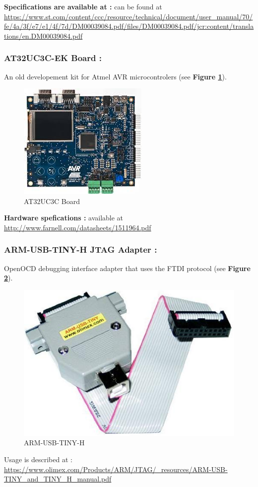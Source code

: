 \textbf{\color{red}Specifications are available at :} can be found at {\color{blue}\url{https://www.st.com/content/ccc/resource/technical/document/user_manual/70/fe/4a/3f/e7/e1/4f/7d/DM00039084.pdf/files/DM00039084.pdf/jcr:content/translations/en.DM00039084.pdf}}    	


\subsubsection{AT32UC3C-EK Board : }
An old developement kit for Atmel AVR microcontrolers (see \textbf{Figure \ref{AT32UC3C Board}}).  
		\begin{figure}[H]
			\centering
        	\includegraphics[scale=0.40]{img/mean/avr32.jpeg}
        	\caption{AT32UC3C Board}
        	\label{AT32UC3C Board}
    	\end{figure}
    	
    	\textbf{\color{red}Hardware spefications :}  available at {\color{blue}\url{http://www.farnell.com/datasheets/1511964.pdf}}

\subsubsection{ARM-USB-TINY-H JTAG Adapter : }  OpenOCD debugging interface adapter that uses the FTDI protocol (see \textbf{Figure \ref{ARM-USB-TINY-H}}).
		\begin{figure}[H]
			\centering
        	\includegraphics[scale=0.25]{img/mean/arm-usb-tiny-h.jpg}
        	\caption{ARM-USB-TINY-H}
        	\label{ARM-USB-TINY-H}
    	\end{figure}
Usage is described at : {\color{blue}\url{https://www.olimex.com/Products/ARM/JTAG/_resources/ARM-USB-TINY_and_TINY_H_manual.pdf}}\\

